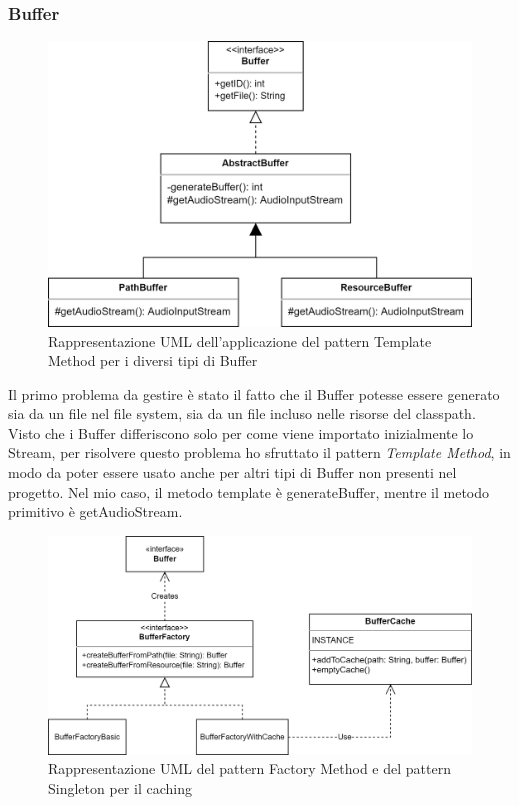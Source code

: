 \documentclass[a4paper,12pt]{report}
\begin{document}
\subsubsection*{Buffer}
\begin{figure}[H]
\centering{}
\includegraphics[width=\textwidth]{img/buffer/Buffer.png}
\caption{Rappresentazione UML dell’applicazione del pattern Template Method per i diversi tipi di Buffer}
\label{img:templatebuffer}
\end{figure}
Il primo problema da gestire è stato il fatto che il Buffer potesse essere generato sia da un file nel file system, sia da un file incluso nelle risorse del classpath. Visto che i Buffer differiscono solo per come viene importato inizialmente lo Stream, per risolvere questo problema ho sfruttato il pattern \textit{Template Method}, in modo da poter essere usato anche per altri tipi di Buffer non presenti nel progetto. Nel mio caso, il metodo template è generateBuffer, mentre il metodo primitivo è getAudioStream.
%
\begin{figure}[H]
\centering{}
\includegraphics[width=\textwidth]{img/buffer/BufferFactory.png}
\caption{Rappresentazione UML del pattern Factory Method e del pattern Singleton per il caching}
\label{img:factory}
\end{figure}
\end{document}
